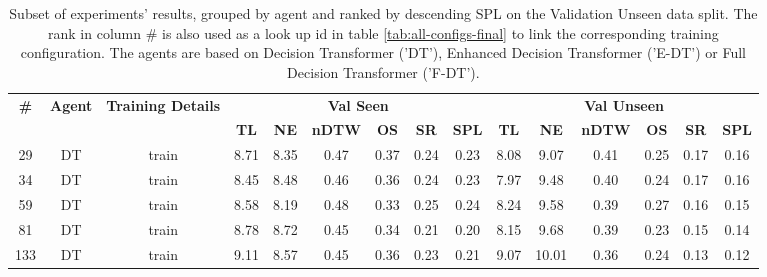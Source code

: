 \begin{table}
\centering
\caption{\label{tab:layers}Subset of experiments' results, grouped by agent and ranked by descending SPL on the Validation Unseen data split. The rank in column \# is also used as a look up id in table \ref{tab:all-configs-final} to link the corresponding training configuration.     \newline The agents are based on Decision Transformer ('DT'), Enhanced Decision Transformer ('E-DT') or Full Decision Transformer ('F-DT').}
\begin{tabular}{@{\hskip3pt}c@{\hskip3pt}c@{\hskip3pt}c@{\hskip3pt}c@{\hskip3pt}c@{\hskip3pt}c@{\hskip3pt}c@{\hskip3pt}c@{\hskip3pt}c@{\hskip3pt}c@{\hskip3pt}c@{\hskip3pt}c@{\hskip3pt}c@{\hskip3pt}c@{\hskip3pt}c}
\toprule
\textbf{\#} & \textbf{Agent} & \textbf{Training Details} & \multicolumn{6}{c}{\textbf{Val Seen}} & \multicolumn{6}{c}{\textbf{Val Unseen}} \\
 \textbf{~} &     \textbf{~} &                \textbf{~} &       \textbf{TL} & \textbf{NE} & \textbf{nDTW} & \textbf{OS} & \textbf{SR} & \textbf{SPL} &         \textbf{TL} & \textbf{NE} & \textbf{nDTW} & \textbf{OS} & \textbf{SR} & \textbf{SPL} \\
\midrule
         29 &             DT &                     train &              8.71 &        8.35 &          0.47 &        0.37 &        0.24 &         0.23 &                8.08 &        9.07 &          0.41 &        0.25 &        0.17 &         0.16 \\
         34 &             DT &                     train &              8.45 &        8.48 &          0.46 &        0.36 &        0.24 &         0.23 &                7.97 &        9.48 &          0.40 &        0.24 &        0.17 &         0.16 \\
         59 &             DT &                     train &              8.58 &        8.19 &          0.48 &        0.33 &        0.25 &         0.24 &                8.24 &        9.58 &          0.39 &        0.27 &        0.16 &         0.15 \\
         81 &             DT &                     train &              8.78 &        8.72 &          0.45 &        0.34 &        0.21 &         0.20 &                8.15 &        9.68 &          0.39 &        0.23 &        0.15 &         0.14 \\
        133 &             DT &                     train &              9.11 &        8.57 &          0.45 &        0.36 &        0.23 &         0.21 &                9.07 &       10.01 &          0.36 &        0.24 &        0.13 &         0.12 \\

\end{tabular}
\end{table}
